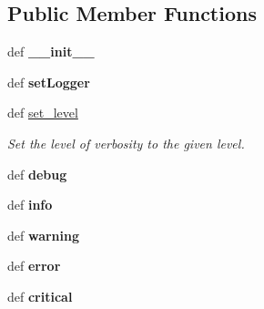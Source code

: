\subsection*{Public Member Functions}
\begin{DoxyCompactItemize}
\item 
\hypertarget{classsrc_1_1core_1_1util_1_1log_1_1Logger_1_1Logger_a6bef702bcc63f86a2f56cc71c23f879e}{def {\bfseries \-\_\-\-\_\-init\-\_\-\-\_\-}}\label{classsrc_1_1core_1_1util_1_1log_1_1Logger_1_1Logger_a6bef702bcc63f86a2f56cc71c23f879e}

\item 
\hypertarget{classsrc_1_1core_1_1util_1_1log_1_1Logger_1_1Logger_a63dae9b40528be2bfeac4ddf03242616}{def {\bfseries set\-Logger}}\label{classsrc_1_1core_1_1util_1_1log_1_1Logger_1_1Logger_a63dae9b40528be2bfeac4ddf03242616}

\item 
def \hyperlink{classsrc_1_1core_1_1util_1_1log_1_1Logger_1_1Logger_ac90ece7c1404d072a0a9b78a2b7cec2c}{set\-\_\-level}
\begin{DoxyCompactList}\small\item\em Set the level of verbosity to the given level. \end{DoxyCompactList}\item 
\hypertarget{classsrc_1_1core_1_1util_1_1log_1_1Logger_1_1Logger_ab5484593e2fa5987516e8fa52d237e29}{def {\bfseries debug}}\label{classsrc_1_1core_1_1util_1_1log_1_1Logger_1_1Logger_ab5484593e2fa5987516e8fa52d237e29}

\item 
\hypertarget{classsrc_1_1core_1_1util_1_1log_1_1Logger_1_1Logger_a516504b83a8435772584ece6eafb152c}{def {\bfseries info}}\label{classsrc_1_1core_1_1util_1_1log_1_1Logger_1_1Logger_a516504b83a8435772584ece6eafb152c}

\item 
\hypertarget{classsrc_1_1core_1_1util_1_1log_1_1Logger_1_1Logger_a33638f7efac3983c4500574d46c40383}{def {\bfseries warning}}\label{classsrc_1_1core_1_1util_1_1log_1_1Logger_1_1Logger_a33638f7efac3983c4500574d46c40383}

\item 
\hypertarget{classsrc_1_1core_1_1util_1_1log_1_1Logger_1_1Logger_a922968c5070f425422bd089493b507b0}{def {\bfseries error}}\label{classsrc_1_1core_1_1util_1_1log_1_1Logger_1_1Logger_a922968c5070f425422bd089493b507b0}

\item 
\hypertarget{classsrc_1_1core_1_1util_1_1log_1_1Logger_1_1Logger_a7de8ea2746a8beea5dbadd5f0d629f8f}{def {\bfseries critical}}\label{classsrc_1_1core_1_1util_1_1log_1_1Logger_1_1Logger_a7de8ea2746a8beea5dbadd5f0d629f8f}

\end{DoxyCompactItemize}
